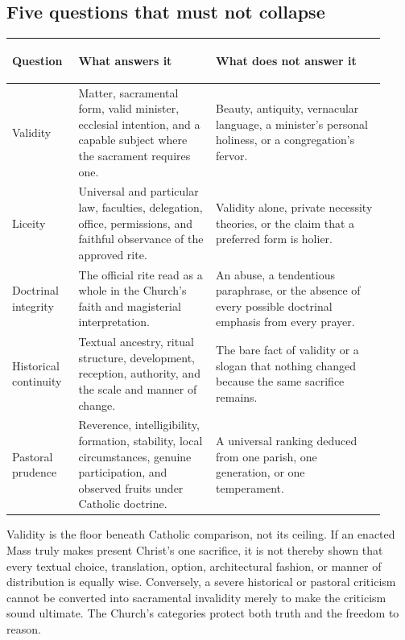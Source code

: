 {
\subsection{Five questions that must not collapse}

\begin{longtable}{>{\bfseries\raggedright\arraybackslash}p{0.16\linewidth}>{\raggedright\arraybackslash}p{0.34\linewidth}>{\raggedright\arraybackslash}p{0.42\linewidth}}
\toprule
\textbf{Question} & \textbf{What answers it} & \textbf{What does not answer it}\\
\midrule
\endhead
Validity & Matter, sacramental form, valid minister, ecclesial intention, and a capable subject where the sacrament requires one. & Beauty, antiquity, vernacular language, a minister's personal holiness, or a congregation's fervor.\\
Liceity & Universal and particular law, faculties, delegation, office, permissions, and faithful observance of the approved rite. & Validity alone, private necessity theories, or the claim that a preferred form is holier.\\
Doctrinal integrity & The official rite read as a whole in the Church's faith and magisterial interpretation. & An abuse, a tendentious paraphrase, or the absence of every possible doctrinal emphasis from every prayer.\\
Historical continuity & Textual ancestry, ritual structure, development, reception, authority, and the scale and manner of change. & The bare fact of validity or a slogan that nothing changed because the same sacrifice remains.\\
Pastoral prudence & Reverence, intelligibility, formation, stability, local circumstances, genuine participation, and observed fruits under Catholic doctrine. & A universal ranking deduced from one parish, one generation, or one temperament.\\
\bottomrule
\end{longtable}

Validity is the floor beneath Catholic comparison, not its ceiling. If an enacted Mass truly makes present Christ's one sacrifice, it is not thereby shown that every textual choice, translation, option, architectural fashion, or manner of distribution is equally wise. Conversely, a severe historical or pastoral criticism cannot be converted into sacramental invalidity merely to make the criticism sound ultimate. The Church's categories protect both truth and the freedom to reason.

\missalevidenceappendix
}

